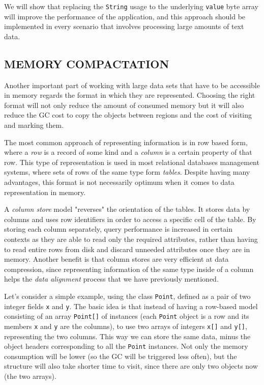 \documentclass[a4paper,twoside]{article}
\begin{document}
We will show that replacing the \texttt{String} usage to the underlying \texttt{value} byte array will improve the performance of the application, and this approach should be implemented in every scenario that involves processing large amounts of text data.



\subsection{\uppercase{Memory Compactation}}
Another important part of working with large data sets that have to be accessible in memory regards the format in which they are represented. Choosing the right format will not only reduce the amount of consumed memory but it will also reduce the GC cost to copy the objects between regions and the cost of visiting and marking them.

The most common approach of representing information is in row based form, where a {\it row} is a record of some kind and a {\it column} is a certain property of that row. This type of representation is used in most relational databases management systems, where sets of rows of the same type form {\it tables}.
Despite having many advantages, this format is not necessarily optimum when it comes to data representation in memory.

A {\it column store} model \cite{abadi:2013} "reverses" the orientation of the tables. It stores data by columns and uses row identifiers in order to access a specific cell of the table. 
By storing each column separately, query performance is increased in certain contexts as they are able to read only the required attributes, rather than having to read entire rows from disk and discard unneeded attributes once they are in memory.
Another benefit is that column stores are very efficient at data compression, since representing information of the same type inside of a column helps the {\it data alignment} process that we have previously mentioned.

Let's consider a simple example, using the class {\tt Point}, defined as a pair of two integer fields {\tt x} and {\tt y}.
The basic idea is that instead of having a row-based model consisting of an array {\tt Point[]} of instances (each {\tt Point} object is a row and its members {\tt x} and {\tt y} are the columns), to use two arrays of integers {\tt x[]} and {\tt y[]}, representing the two columns. 
This way we can store the same data, minus the object headers corresponding to all the {\tt Point} instances. Not only the memory consumption will be lower (so the GC will be triggered less often), but the structure will also take shorter time to visit, since there are only two objects now (the two arrays).
\end{document}
